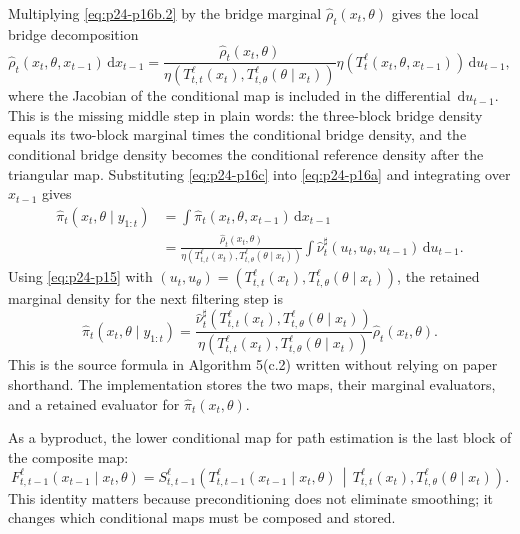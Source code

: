 \documentclass[11pt]{article}
\numberwithin{equation}{section}
\newcommand{\dd}{\,\mathrm d}
\begin{document}
Multiplying \eqref{eq:p24-p16b.2} by the bridge marginal
\(\widehat\rho_t(x_t,\theta)\) gives the local bridge decomposition
\begin{equation}
    \widehat\rho_t(x_t,\theta,x_{t-1})\dd x_{t-1}
    =
    \frac{
    \widehat\rho_t(x_t,\theta)}
    {\eta(T_{t,t}^{\ell}(x_t),T_{t,\theta}^{\ell}(\theta\mid x_t))}
    \eta(T_t^\ell(x_t,\theta,x_{t-1}))\dd u_{t-1},
    \label{eq:p24-p16c}
\end{equation}
where the Jacobian of the conditional map is included in the differential
\(\dd u_{t-1}\).  This is the missing middle step in plain words: the
three-block bridge density equals its two-block marginal times the conditional
bridge density, and the conditional bridge density becomes the conditional
reference density after the triangular map.  Substituting \eqref{eq:p24-p16c} into \eqref{eq:p24-p16a}
and integrating over
\(x_{t-1}\) gives
\begin{equation}
\begin{aligned}
 \widehat\pi_t(x_t,\theta\mid y_{1:t})
 &=
 \int \widehat\pi_t(x_t,\theta,x_{t-1})\dd x_{t-1}\\
 &=
 \frac{\widehat\rho_t(x_t,\theta)}
 {\eta(T_{t,t}^{\ell}(x_t),T_{t,\theta}^{\ell}(\theta\mid x_t))}
 \int \widehat\nu_t^\sharp(u_t,u_\theta,u_{t-1})\dd u_{t-1}.
\end{aligned}
    \label{eq:p24-p16d}
\end{equation}
Using \eqref{eq:p24-p15} with
\((u_t,u_\theta)=
(T_{t,t}^{\ell}(x_t),T_{t,\theta}^{\ell}(\theta\mid x_t))\), the retained
marginal density for the next filtering step is
\begin{equation}
    \widehat\pi_t(x_t,\theta\mid y_{1:t})
    =
    \frac{
    \widehat\nu_t^\sharp\!\left(
    T_{t,t}^{\ell}(x_t),
    T_{t,\theta}^{\ell}(\theta\mid x_t)
    \right)}
    {
    \eta\!\left(
    T_{t,t}^{\ell}(x_t),
    T_{t,\theta}^{\ell}(\theta\mid x_t)
    \right)}
    \widehat\rho_t(x_t,\theta).
    \label{eq:p24-p17}
\end{equation}
This is the source formula in Algorithm 5(c.2) written without relying on
paper shorthand.  The implementation stores the two maps, their marginal
evaluators, and a retained evaluator for \(\widehat\pi_t(x_t,\theta)\).

As a byproduct, the lower conditional map for path estimation is the last block
of the composite map:
\begin{equation}
    F_{t,t-1}^{\ell}(x_{t-1}\mid x_t,\theta)
    =
    S_{t,t-1}^{\ell}
    \!\left(
    T_{t,t-1}^{\ell}(x_{t-1}\mid x_t,\theta)
    \,\middle|\,
    T_{t,t}^{\ell}(x_t),
    T_{t,\theta}^{\ell}(\theta\mid x_t)
    \right).
    \label{eq:p24-p18}
\end{equation}
This identity matters because preconditioning does not eliminate smoothing; it
changes which conditional maps must be composed and stored.
\end{document}
